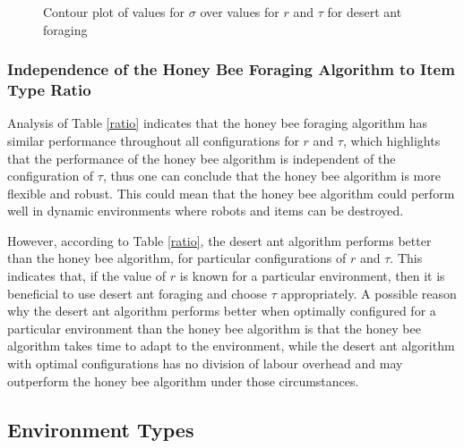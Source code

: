 \begin{figure}[!htb]
\centering
\resizebox{0.8\textwidth}{!}{}
\caption{Contour plot of values for $\sigma$ over values for $r$ and $\tau$ for desert ant foraging}
\label{desertantplot}
\end{figure}


%


\subsubsection{Independence of the Honey Bee Foraging Algorithm to Item Type Ratio}
\label{Adaptability}

Analysis of Table \ref{ratio} indicates that the honey bee foraging algorithm has similar performance throughout all configurations for $r$ and $\tau$, which highlights that the performance of the honey bee algorithm is independent of the configuration of $\tau$, thus one can conclude that the honey bee algorithm is more flexible and robust. This could mean that the honey bee algorithm could perform well in dynamic environments where robots and items can be destroyed.

However, according to Table \ref{ratio}, the desert ant algorithm performs better than the honey bee algorithm, for particular configurations of $r$ and $\tau$. This indicates that, if the value of $r$ is known for a particular environment, then it is beneficial to use desert ant foraging and choose $\tau$ appropriately. A possible reason why the desert ant algorithm performs better when optimally configured for a particular environment than the honey bee algorithm is that the honey bee algorithm takes time to adapt to the environment, while the desert ant algorithm with optimal configurations has no division of labour overhead and may outperform the honey bee algorithm under those circumstances.

\subsection{Environment Types}
\label{results:environmentaltypes}

